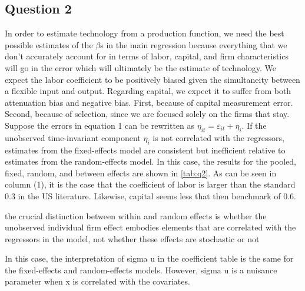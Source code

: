 \documentclass[11pt]{article}
\begin{document}
\subsection*{Question 2}
In order to estimate technology from a production function, we need the best possible estimates of the $\beta$s in the main regression because everything that we don't accurately account for in terms of labor, capital, and firm characteristics will go in the error which will ultimately be the estimate of technology. We expect the labor coefficient to be positively biased given the simultaneity between a flexible input and output. Regarding capital, we expect it to suffer from both attenuation bias and negative bias. First, because of capital measurement error. Second, because of selection, since we are focused solely on the firms that stay.  \\

Suppose the errors in equation 1 can be rewritten as $\eta_{it}=\varepsilon_{it}+\eta_{i}$. If the unobserved time-invariant component $\eta_{i}$ is not correlated with the regressors, estimates from the fixed-effects model are consistent but inefficient relative to estimates from the random-effects model.
In this case, the results for the pooled, fixed, random, and between effects  are shown in \autoref{tab:q2}. As can be seen in column (1), it is the case that the coefficient of labor is larger than the standard 0.3 in the US literature. Likewise, capital seems less that then benchmark of 0.6.


the crucial distinction between within and random effects is whether the unobserved individual firm effect embodies elements that are correlated with the regressors in the model, not whether these effects are stochastic or not

In this case, the interpretation of sigma u in the coefficient table is the same for the fixed-effects and random-effects models. However, sigma u is a nuisance parameter when x is correlated with the covariates.
\end{document}
